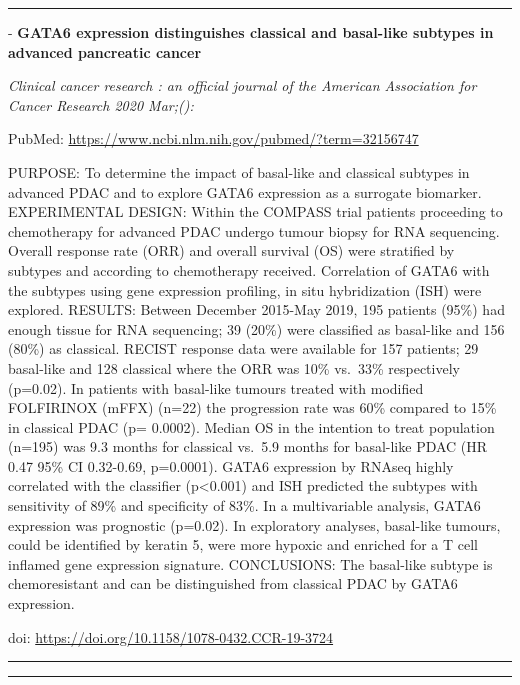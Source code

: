 \documentclass[
]{article}
\begin{document}
\begin{center}\rule{0.5\linewidth}{0.5pt}\end{center}

- \textbf{GATA6 expression distinguishes classical and basal-like
subtypes in advanced pancreatic cancer}

\emph{Clinical cancer research : an official journal of the American
Association for Cancer Research 2020 Mar;():}

PubMed: \url{https://www.ncbi.nlm.nih.gov/pubmed/?term=32156747}

PURPOSE: To determine the impact of basal-like and classical subtypes in
advanced PDAC and to explore GATA6 expression as a surrogate biomarker.
EXPERIMENTAL DESIGN: Within the COMPASS trial patients proceeding to
chemotherapy for advanced PDAC undergo tumour biopsy for RNA sequencing.
Overall response rate (ORR) and overall survival (OS) were stratified by
subtypes and according to chemotherapy received. Correlation of GATA6
with the subtypes using gene expression profiling, in situ hybridization
(ISH) were explored. RESULTS: Between December 2015-May 2019, 195
patients (95\%) had enough tissue for RNA sequencing; 39 (20\%) were
classified as basal-like and 156 (80\%) as classical. RECIST response
data were available for 157 patients; 29 basal-like and 128 classical
where the ORR was 10\% vs.~33\% respectively (p=0.02). In patients with
basal-like tumours treated with modified FOLFIRINOX (mFFX) (n=22) the
progression rate was 60\% compared to 15\% in classical PDAC (p=
0.0002). Median OS in the intention to treat population (n=195) was 9.3
months for classical vs.~5.9 months for basal-like PDAC (HR 0.47 95\% CI
0.32-0.69, p=0.0001). GATA6 expression by RNAseq highly correlated with
the classifier (p\textless0.001) and ISH predicted the subtypes with
sensitivity of 89\% and specificity of 83\%. In a multivariable
analysis, GATA6 expression was prognostic (p=0.02). In exploratory
analyses, basal-like tumours, could be identified by keratin 5, were
more hypoxic and enriched for a T cell inflamed gene expression
signature. CONCLUSIONS: The basal-like subtype is chemoresistant and can
be distinguished from classical PDAC by GATA6 expression.

doi: \url{https://doi.org/10.1158/1078-0432.CCR-19-3724}

\begin{center}\rule{0.5\linewidth}{0.5pt}\end{center}

\begin{center}\rule{0.5\linewidth}{0.5pt}\end{center}
\end{document}

